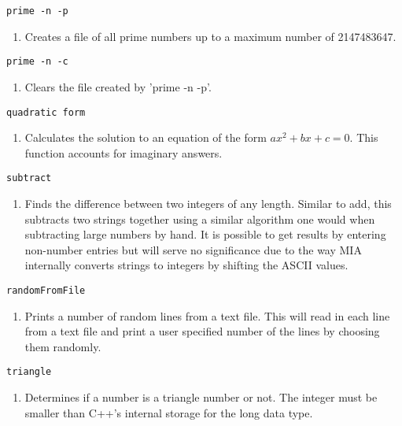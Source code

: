 \begin{lstlisting} 
prime -n -p   
\end{lstlisting}
\begin{enumerate}
	\item[] Creates a file of all prime numbers up to a maximum number of 2147483647.
\end{enumerate}

\begin{lstlisting} 
prime -n -c   
\end{lstlisting}
\begin{enumerate}
	\item[] Clears the file created by 'prime -n -p'.
\end{enumerate}

\begin{lstlisting} 
quadratic form
\end{lstlisting}
\begin{enumerate}
	\item[] Calculates the solution to an equation of the form $ax^2+bx+c=0$. This function accounts for imaginary answers.
\end{enumerate}

\begin{lstlisting} 
subtract   
\end{lstlisting}
\begin{enumerate}
	\item[] Finds the difference between two integers of any length. Similar to add, this subtracts two strings together using a similar algorithm one would when subtracting large numbers by hand. It is possible to get results by entering non-number entries but will serve no significance due to the way MIA internally converts strings to integers by shifting the ASCII values.
\end{enumerate}

\begin{lstlisting} 
randomFromFile
\end{lstlisting}
\begin{enumerate}
	\item[]  Prints a number of random lines from a text file. This will read in each line from a text file and print a user specified number of the lines by choosing them randomly.
\end{enumerate}

\begin{lstlisting} 
triangle   
\end{lstlisting}
\begin{enumerate}
	\item[] Determines if a number is a triangle number or not. The integer must be smaller than C++'s internal storage for the long data type.
\end{enumerate}

